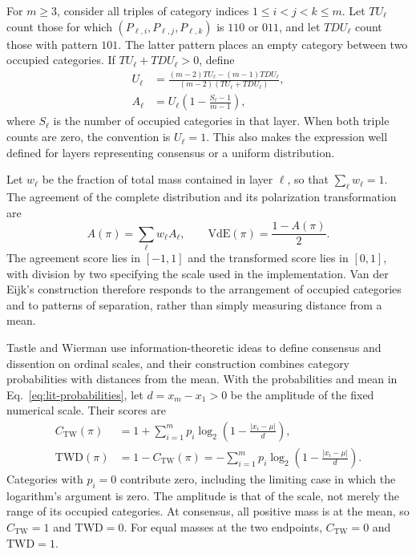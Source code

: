 \documentclass{article}
\theoremstyle{plain}
\theoremstyle{remark}
\begin{document}
For $m\geq3$, consider all triples of category indices $1\leq i<j<k\leq m$. Let $TU_\ell$ count those for which $(P_{\ell,i},P_{\ell,j},P_{\ell,k})$ is $110$ or $011$, and let $TDU_\ell$ count those with pattern $101$. The latter pattern places an empty category between two occupied categories. If $TU_\ell+TDU_\ell>0$, define
\begin{equation}\label{eq:lit-vde-layer}
\begin{aligned}
U_\ell
 &=\frac{(m-2)TU_\ell-(m-1)TDU_\ell}
         {(m-2)(TU_\ell+TDU_\ell)},\\
A_\ell
 &=U_\ell\left(1-\frac{S_\ell-1}{m-1}\right),
\end{aligned}
\end{equation}
where $S_\ell$ is the number of occupied categories in that layer. When both triple counts are zero, the convention is $U_\ell=1$. This also makes the expression well defined for layers representing consensus or a uniform distribution.

Let $w_\ell$ be the fraction of total mass contained in layer $\ell$, so that $\sum_\ell w_\ell=1$. The agreement of the complete distribution and its polarization transformation are
\begin{equation}\label{eq:lit-vde}
A(\pi)=\sum_\ell w_\ell A_\ell,
\qquad
\mathrm{VdE}(\pi)=\frac{1-A(\pi)}{2}.
\end{equation}
The agreement score lies in $[-1,1]$ and the transformed score lies in $[0,1]$, with division by two specifying the scale used in the implementation. Van der Eijk's construction therefore responds to the arrangement of occupied categories and to patterns of separation, rather than simply measuring distance from a mean.

Tastle and Wierman \citep{tastle2007consensus} use information-theoretic ideas to define consensus and dissention on ordinal scales, and their construction combines category probabilities with distances from the mean. With the probabilities and mean in Eq.~\eqref{eq:lit-probabilities}, let $d=x_m-x_1>0$ be the amplitude of the fixed numerical scale. Their scores are
\begin{equation}\label{eq:lit-twd}
\begin{aligned}
C_{\mathrm{TW}}(\pi)
 &=1+\sum_{i=1}^{m}p_i
       \log_2\left(1-\frac{|x_i-\mu|}{d}\right),\\
\mathrm{TWD}(\pi)
 &=1-C_{\mathrm{TW}}(\pi)
  =-\sum_{i=1}^{m}p_i
       \log_2\left(1-\frac{|x_i-\mu|}{d}\right).
\end{aligned}
\end{equation}
Categories with $p_i=0$ contribute zero, including the limiting case in which the logarithm's argument is zero. The amplitude is that of the scale, not merely the range of its occupied categories. At consensus, all positive mass is at the mean, so $C_{\mathrm{TW}}=1$ and $\mathrm{TWD}=0$. For equal masses at the two endpoints, $C_{\mathrm{TW}}=0$ and $\mathrm{TWD}=1$.
\end{document}
